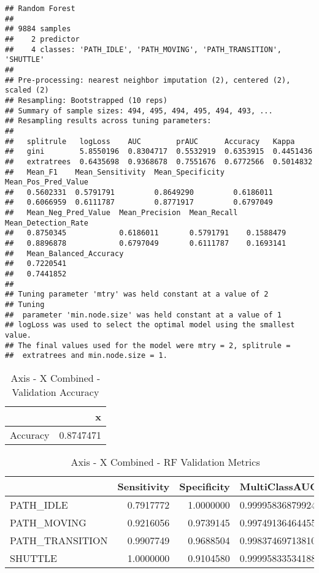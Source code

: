 \documentclass[]{article}
\begin{document}
\begin{verbatim}
## Random Forest 
## 
## 9884 samples
##    2 predictor
##    4 classes: 'PATH_IDLE', 'PATH_MOVING', 'PATH_TRANSITION', 'SHUTTLE' 
## 
## Pre-processing: nearest neighbor imputation (2), centered (2), scaled (2) 
## Resampling: Bootstrapped (10 reps) 
## Summary of sample sizes: 494, 495, 494, 495, 494, 493, ... 
## Resampling results across tuning parameters:
## 
##   splitrule   logLoss    AUC        prAUC      Accuracy   Kappa    
##   gini        5.8550196  0.8304717  0.5532919  0.6353915  0.4451436
##   extratrees  0.6435698  0.9368678  0.7551676  0.6772566  0.5014832
##   Mean_F1    Mean_Sensitivity  Mean_Specificity  Mean_Pos_Pred_Value
##   0.5602331  0.5791791         0.8649290         0.6186011          
##   0.6066959  0.6111787         0.8771917         0.6797049          
##   Mean_Neg_Pred_Value  Mean_Precision  Mean_Recall  Mean_Detection_Rate
##   0.8750345            0.6186011       0.5791791    0.1588479          
##   0.8896878            0.6797049       0.6111787    0.1693141          
##   Mean_Balanced_Accuracy
##   0.7220541             
##   0.7441852             
## 
## Tuning parameter 'mtry' was held constant at a value of 2
## Tuning
##  parameter 'min.node.size' was held constant at a value of 1
## logLoss was used to select the optimal model using the smallest value.
## The final values used for the model were mtry = 2, splitrule =
##  extratrees and min.node.size = 1.
\end{verbatim}

\begin{table}[!h]

\caption{\label{tab:sensor-x-combined-rf-results}Axis - X Combined - Validation Accuracy}
\centering
\begin{tabular}[t]{lr}
\toprule
  & x\\
\midrule
Accuracy & 0.8747471\\
\bottomrule
\end{tabular}
\end{table}

\begin{table}[!h]

\caption{\label{tab:sensor-x-combined-rf-results}Axis - X Combined - RF Validation Metrics}
\centering
\begin{tabular}[t]{lrrl}
\toprule
  & Sensitivity & Specificity & MultiClassAUC\\
\midrule
PATH\_IDLE & 0.7917772 & 1.0000000 & 0.99995836879924\\
PATH\_MOVING & 0.9216056 & 0.9739145 & 0.997491364644557\\
PATH\_TRANSITION & 0.9907749 & 0.9688504 & 0.998374697138108\\
SHUTTLE & 1.0000000 & 0.9104580 & 0.999958335341889\\
\bottomrule
\end{tabular}
\end{table}
\end{document}
